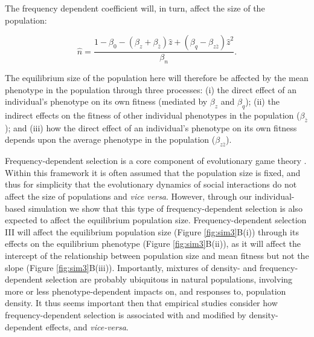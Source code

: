 \documentclass{article}
\begin{document}
\noindent The frequency dependent coefficient will, in turn, affect the size of the population:

\begin{equation}
\hat{n} = \frac{1-\beta_{0}-(\beta_{z}   + \beta_{\bar{z}})\hat{z} + (\beta_{q} - \beta_{z\bar{z}})\hat{z}^2}{\beta_{n}}.
\end{equation}

\noindent The equilibrium size of the population here will therefore be affected by the mean phenotype in the population through three processes: (i) the direct effect of an individual's phenotype on its own fitness (mediated by $\beta_z$ and $ \beta_q$); (ii) the indirect effects on the fitness of other individual phenotypes in the population ($\beta_{\bar{z}}$); and (iii) how the direct effect of an individual's phenotype on its own fitness depends upon the average phenotype in the population ($\beta_{z\bar{z}}$). 
 
 Frequency-dependent selection is a core component of evolutionary game theory \citep{MaynardSmith1982}. Within this framework it is often assumed that the population size is fixed, and thus for simplicity that the evolutionary dynamics of social interactions do not affect the size of populations and  \textit{vice versa}. However, through our individual-based simulation we show that this type of frequency-dependent selection is also expected to affect the equilibrium population size. Frequency-dependent selection III will affect the equilibrium population size (Figure \ref{fig:sim3}B(i)) through its effects on the equilibrium phenotype (Figure \ref{fig:sim3}B(ii)), as it will affect the intercept of the relationship between population size and mean fitness but not the slope (Figure \ref{fig:sim3}B(iii)). Importantly, mixtures of density- and frequency-dependent selection are probably ubiquitous in natural populations, involving more or less phenotype-dependent impacts on, and responses to, population density. It thus seems important then that empirical studies consider how frequency-dependent selection is associated with and modified by density-dependent effects, and \textit{vice-versa}.
\end{document}

